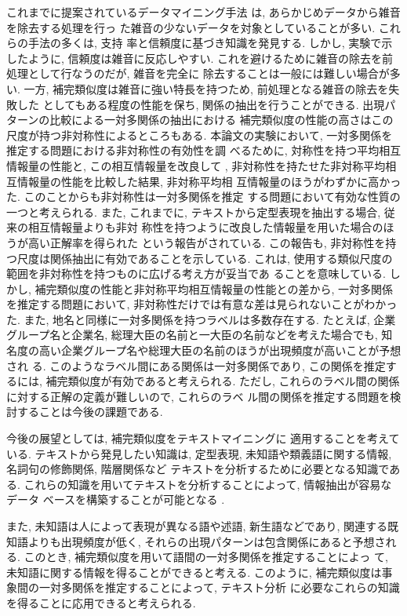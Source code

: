 これまでに提案されているデータマイニング手法
\cite{Adriaans96,Fayyad96b}は, あらかじめデータから雑音を除去する処理を行っ
た雑音の少ないデータを対象としていることが多い. これらの手法の多くは, 支持
率と信頼度に基づき知識を発見する. しかし, 実験で示したように, 
信頼度は雑音に反応しやすい. 
これを避けるために雑音の除去を前処理として行なうのだが, 雑音を完全に
除去することは一般には難しい場合が多い. 
一方, 補完類似度は雑音に強い特長を持つため, 前処理となる雑音の除去を失敗した
としてもある程度の性能を保ち, 関係の抽出を行うことができる. 
出現パターンの比較による一対多関係の抽出における
補完類似度の性能の高さはこの尺度が持つ非対称性によるところもある. 
本論文の実験において, 一対多関係を推定する問題における非対称性の有効性を調
べるために, 対称性を持つ平均相互情報量の性能と, この相互情報量を改良して
, 非対称性を持たせた非対称平均相互情報量の性能を比較した結果, 非対称平均相
互情報量のほうがわずかに高かった. 
このことからも非対称性は一対多関係を推定
する問題において有効な性質の一つと考えられる. 
また, これまでに, テキストから定型表現を抽出する場合, 従来の相互情報量よりも非対
称性を持つように改良した情報量を用いた場合のほうが高い正解率を得られた
という報告がされている\cite{Sinnou95}.
この報告も, 非対称性を持つ尺度は関係抽出に有効であることを示している.
これは, 使用する類似尺度の範囲を非対称性を持つものに広げる考え方が妥当であ
ることを意味している. 
しかし, 補完類似度の性能と非対称平均相互情報量の性能との差から, 
一対多関係を推定する問題において, 非対称性だけでは有意な差は見られないことがわかった. 
また, 地名と同様に一対多関係を持つラベルは多数存在する. 
たとえば, 企業グループ名と企業名, 
総理大臣の名前と一大臣の名前などを考えた場合でも, 
知名度の高い企業グループ名や総理大臣の名前のほうが出現頻度が高いことが予想され
る.
このようなラベル間にある関係は一対多関係であり, この関係を推定するには, 
補完類似度が有効であると考えられる. 
ただし, これらのラベル間の関係に対する正解の定義が難しいので, これらのラベ
ル間の関係を推定する問題を検討することは今後の課題である. 

今後の展望としては, 補完類似度をテキストマイニングに
適用することを考えている. 
テキストから発見したい知識は, 定型表現, 
未知語や類義語に関する情報, 名詞句の修飾関係, 階層関係など
テキストを分析するために必要となる知識である. 
これらの知識を用いてテキストを分析することによって, 情報抽出が容易なデータ
ベースを構築することが可能となる
\cite{Glymour97}. 

また, 未知語は人によって表現が異なる語や述語, 新生語などであり, 
関連する既知語よりも出現頻度が低く, 
それらの出現パターンは包含関係にあると予想される. 
このとき, 補完類似度を用いて語間の一対多関係を推定することによっ
て, 未知語に関する情報を得ることができると考える. 
このように, 補完類似度は事象間の一対多関係を推定することによって, テキスト分析
に必要なこれらの知識を得ることに応用できると考えられる. 

